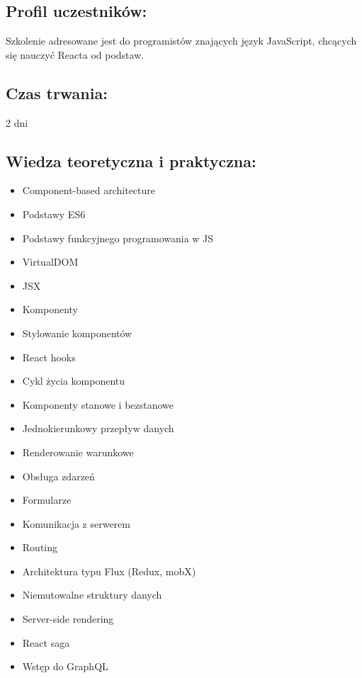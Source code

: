 \documentclass{article}[10pt]
\begin{document}
	\subsection*{Profil uczestników:}
\begin{adjustwidth}{2cm}{}
\justifying
	
Szkolenie adresowane jest do programistów znających język JavaScript, chcących się nauczyć Reacta od podstaw.
\end{adjustwidth}
	\subsection*{Czas trwania:}
\begin{adjustwidth}{2cm}{}
	2 dni
\end{adjustwidth}

	\subsection*{Wiedza teoretyczna i praktyczna:}
\begin{adjustwidth}{1.5cm}{}
	\begin{itemize}
		\item Component-based architecture
		\item Podstawy ES6
		\item Podstawy funkcyjnego programowania w JS
		\item VirtualDOM
		\item JSX
		\item Komponenty
		\item Stylowanie komponentów
		\item React hooks
		\item Cykl życia komponentu
		\item Komponenty stanowe i bezstanowe
		\item Jednokierunkowy przepływ danych
		\item Renderowanie warunkowe
		\item Obsługa zdarzeń
		\item Formularze
		\item Komunikacja z serwerem
		\item Routing
		\item Architektura typu Flux (Redux, mobX)
		\item Niemutowalne struktury danych
		\item Server-side rendering
		\item React saga
		\item Wstęp do GraphQL
	\end{itemize}
\end{adjustwidth}
\end{document}
